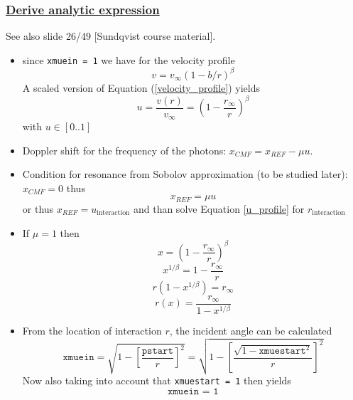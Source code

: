 \documentclass[../main/main.tex]{subfiles}
\begin{document}
\subsubsection{\underline{Derive analytic expression}} See also slide  26/49 [Sundqvist course material]. 
\begin{itemize}
\item since \texttt{xmuein = 1} we have for the velocity profile 
\begin{equation}
v = v_{\infty}(1-b/r)^{\beta}
\label{velocity_profile}
\end{equation}
A scaled version of Equation (\ref{velocity_profile}) yields 
\begin{equation}
u = \frac{v(r)}{v_{\infty}} = \left(1 - \frac{r_{\infty}}{r} \right)^{\beta} 
\label{u_profile}
\end{equation}
with $u \in [0..1]$

\item Doppler shift for the frequency of the photons: $x_{CMF} = x_{REF} - \mu u$.
\item Condition for resonance from Sobolov approximation (to be studied later): $\boxed{x_{CMF}= 0}$ thus 
\begin{equation}
x_{REF} = \mu u
\label{analytic_profile}
\end{equation}
or thus $x_{REF} = \boxed{u_{\text{interaction}}}$ and than solve Equation \ref{u_profile} for $r_{\text{interaction}}$


\item If $\mu = 1$ then 
\begin{equation}
x = \left(1 - \frac{r_{\infty}}{r} \right)^{\beta}
\end{equation}
\begin{equation*}
x^{1/\beta} = 1 - \frac{r_{\infty}}{r}
\end{equation*}
\begin{equation*}
r(1-x^{1/\beta}) = r_{\infty}
\end{equation*}
\begin{equation}
\boxed{r(x) = \frac{r_{\infty}}{1-x^{1/\beta}}}
\end{equation}

\noindent{} 

\item From the location of interaction $r$, the incident angle can be calculated
\begin{equation}
\texttt{xmuein} = \sqrt{1-\left[\frac{\texttt{pstart}}{r}\right]^2} = \sqrt{1 - \left[ \frac{\sqrt{1-\texttt{xmuestart}^2}}{r} \right]^2}
\end{equation}
Now also taking into account that \texttt{xmuestart = 1} then yields
\begin{equation}
\texttt{xmuein = 1}
\end{equation}


\end{itemize}
\end{document}
